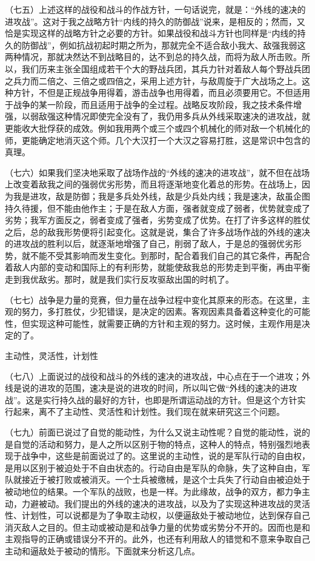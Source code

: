 \documentclass[UTF8, 12pt, a4paper]{ctexrep}
\begin{document}
（七五）上述这样的战役和战斗的作战方针，一句话说完，就是：“外线的速决的进攻战”。这对于我之战略方针“内线的持久的防御战”说来，是相反的；然而，又恰是实现这样的战略方针之必要的方针。如果战役和战斗方针也同样是“内线的持久的防御战”，例如抗战初起时期之所为，那就完全不适合敌小我大、敌强我弱这两种情况，那就决然达不到战略目的，达不到总的持久战，而将为敌人所击败。所以，我们历来主张全国组成若干个大的野战兵团，其兵力针对着敌人每个野战兵团之兵力而二倍之、三倍之或四倍之，采用上述方针，与敌周旋于广大战场之上。这种方针，不但是正规战争用得着，游击战争也用得着，而且必须要用它。不但适用于战争的某一阶段，而且适用于战争的全过程。战略反攻阶段，我之技术条件增强，以弱敌强这种情况即使完全没有了，我仍用多兵从外线采取速决的进攻战，就更能收大批俘获的成效。例如我用两个或三个或四个机械化的师对敌一个机械化的师，更能确定地消灭这个师。几个大汉打一个大汉之容易打胜，这是常识中包含的真理。

（七六）如果我们坚决地采取了战场作战的“外线的速决的进攻战”，就不但在战场上改变着敌我之间的强弱优劣形势，而且将逐渐地变化着总的形势。在战场上，因为我是进攻，敌是防御；我是多兵处外线，敌是少兵处内线；我是速决，敌虽企图持久待援，但不能由他作主；于是在敌人方面，强者就变成了弱者，优势就变成了劣势；我军方面反之，弱者变成了强者，劣势变成了优势。在打了许多这样的胜仗之后，总的敌我形势便将引起变化。这就是说，集合了许多战场作战的外线的速决的进攻战的胜利以后，就逐渐地增强了自己，削弱了敌人，于是总的强弱优劣形势，就不能不受其影响而发生变化。到那时，配合着我们自己的其它条件，再配合着敌人内部的变动和国际上的有利形势，就能使敌我总的形势走到平衡，再由平衡走到我优敌劣。那时，就是我们实行反攻驱敌出国的时机了。

（七七）战争是力量的竞赛，但力量在战争过程中变化其原来的形态。在这里，主观的努力，多打胜仗，少犯错误，是决定的因素。客观因素具备着这种变化的可能性，但实现这种可能性，就需要正确的方针和主观的努力。这时候，主观作用是决定的了。

主动性，灵活性，计划性

（七八）上面说过的战役和战斗的外线的速决的进攻战，中心点在于一个进攻；外线是说的进攻的范围，速决是说的进攻的时间，所以叫它做“外线的速决的进攻战”。这是实行持久战的最好的方针，也即是所谓运动战的方针。但是这个方针实行起来，离不了主动性、灵活性和计划性。我们现在就来研究这三个问题。

（七九）前面已说过了自觉的能动性，为什么又说主动性呢？自觉的能动性，说的是自觉的活动和努力，是人之所以区别于物的特点，这种人的特点，特别强烈地表现于战争中，这些是前面说过了的。这里说的主动性，说的是军队行动的自由权，是用以区别于被迫处于不自由状态的。行动自由是军队的命脉，失了这种自由，军队就接近于被打败或被消灭。一个士兵被缴械，是这个士兵失了行动自由被迫处于被动地位的结果。一个军队的战败，也是一样。为此缘故，战争的双方，都力争主动，力避被动。我们提出的外线的速决的进攻战，以及为了实现这种进攻战的灵活性、计划性，可以说都是为了争取主动权，以便逼敌处于被动地位，达到保存自己消灭敌人之目的。但主动或被动是和战争力量的优势或劣势分不开的。因而也是和主观指导的正确或错误分不开的。此外，也还有利用敌人的错觉和不意来争取自己主动和逼敌处于被动的情形。下面就来分析这几点。
\end{document}

